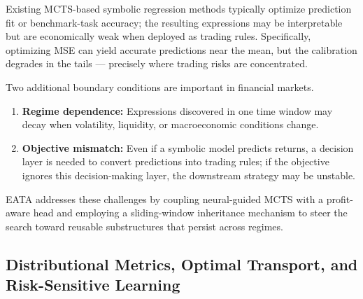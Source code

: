 Existing MCTS-based symbolic regression methods typically optimize prediction fit or benchmark-task accuracy; the resulting expressions may be interpretable but are economically weak when deployed as trading rules. Specifically, optimizing MSE can yield accurate predictions near the mean, but the calibration degrades in the tails --- precisely where trading risks are concentrated.

Two additional boundary conditions are important in financial markets.
\begin{enumerate}
    \item \textbf{Regime dependence:} Expressions discovered in one time window may decay when volatility, liquidity, or macroeconomic conditions change.
    \item \textbf{Objective mismatch:} Even if a symbolic model predicts returns, a decision layer is needed to convert predictions into trading rules; if the objective ignores this decision-making layer, the downstream strategy may be unstable.
\end{enumerate}

EATA addresses these challenges by coupling neural-guided MCTS with a profit-aware head and employing a sliding-window inheritance mechanism to steer the search toward reusable substructures that persist across regimes.

\subsection{Distributional Metrics, Optimal Transport, and Risk-Sensitive Learning}

